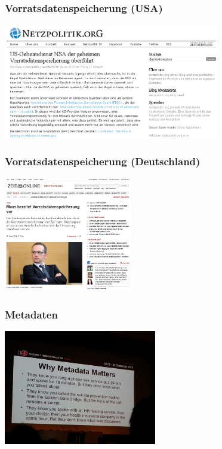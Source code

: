 \documentclass[12pt]{beamer}
\begin{document}
\subsection{}

\begin{frame}
  \frametitle{Vorratsdatenspeicherung (USA)}
    \begin{center}
      \includegraphics[height=5cm]{img/netzpolitik-verizon.png}
    \end{center}
\end{frame}

\begin{frame}
  \frametitle{Vorratsdatenspeicherung (Deutschland)}
    \begin{center}
      \includegraphics[height=5cm]{img/zeit-vds.png}
    \end{center}
\end{frame}

\begin{frame}
  \frametitle{Metadaten}
    \begin{center}
      \includegraphics[height=5cm]{img/metadata-matters.jpg}
    \end{center}
\end{frame}
\end{document}

